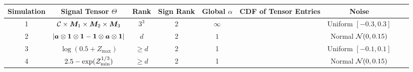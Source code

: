 \documentclass[10pt]{article}
\begin{document}
\renewcommand{\arraystretch}{1}

\begin{table}
\begin{tabular}{c|cccccccc}
Simulation &Signal Tensor $\Theta$ & Rank&  Sign Rank  & Global $\alpha $&CDF of Tensor Entries & Noise  \\
\hline
1&$\mathcal{C}\times\bm M_1\times\bm M_2\times\bm M_3$ &$3^3$&2& $\infty$& \multirow{4}{*}{
}
 &
Uniform $[-0.3,0.3]$\\
  \rowcolor{lightgray}
2& $|\bm{a}\otimes \mathbf{1}\otimes\mathbf{1}-\mathbf{1}\otimes\bm{a}\otimes \mathbf{1}|$& $d$&2&$1$&&
Normal $\mathcal{N}(0,0.15)$\\
3& $\log(0.5+Z_{\max})$&$\geq d$& 2& 1&&
Uniform $[-0.1,0.1]$\\
 \rowcolor{lightgray}
4& $2.5-\exp(\mathcal{Z}^{1/3}_{\min})$& $\geq d$ & 2 & 1 & &
Normal $\mathcal{N}(0,0.15)$
\end{tabular}
\end{table}
\end{document}
